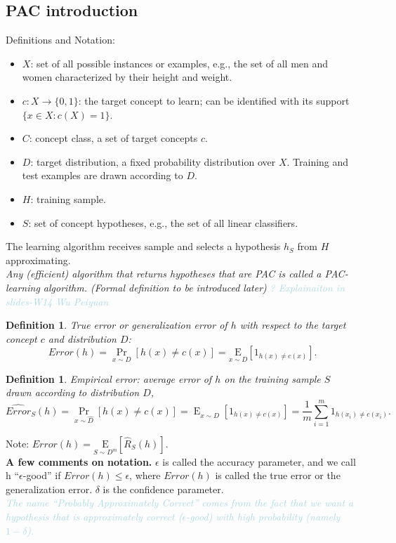\documentclass[12pt, a4paper, oneside]{article}
\newtheorem{definition}[theorem]{Definition}
\begin{document}
\subsection{PAC introduction}
Definitions and Notation:
\begin{itemize}
    \item $X$: set of all possible instances or examples, e.g., 
    the set of all men and women characterized by their height and weight.
    \item $c: X \rightarrow \{0, 1\}$: the target concept to learn; can be identified with its support $\{x \in X: c(X)=1\}$.
    \item $C$: concept class, a set of target concepts $c$.
    \item $D$: target distribution, a fixed probability distribution over $X$. Training and test examples are drawn according to $D$.
    \item $H$: training sample.
    \item $S$: set of concept hypotheses, e.g., the set of all linear classifiers. 
\end{itemize}
The learning algorithm receives sample and selects a hypothesis $h_S$ from $H$ approximating.
\\\textit{Any (efficient) algorithm that returns hypotheses that are PAC is called a PAC-learning algorithm. 
(Formal definition to be introduced later)} \textit{\textcolor{lightBlue}{? Explainaiton in slides-W14 Wu Peiyuan}}
\begin{definition}
    True error or generalization error of $h$ with respect to the target concept $c$ and distribution $D$:
    \begin{equation*}
        Error(h)=\operatorname{Pr}_{x \sim D}[h(x) \neq c(x)]=\underset{x \sim D}{\mathrm{E}}\left[1_{h(x) \neq c(x)}\right] .
    \end{equation*}    
\end{definition}
\begin{definition}
    Empirical error: average error of $ h $ on the training sample $ S $ drawn according to distribution $ D $,
    \begin{equation*}
        \widehat{Error}_{S}(h)=\operatorname{Pr}_{x \sim \widehat{D}}[h(x) \neq c(x)]=\operatorname{E}_{x \sim \widehat{D}}\left[1_{h(x) \neq c(x)}\right]=\frac{1}{m} \sum_{i=1}^{m} 1_{h\left(x_{i}\right) \neq c\left(x_{i}\right)} .
    \end{equation*}
\end{definition}
Note: $ Error(h)=\underset{S \sim D^{m}}{\mathrm{E}}\left[\widehat{R}_{S}(h)\right]$.
\\ \textbf{A few comments on notation.} $\epsilon$ is called the accuracy parameter, and we call h “$\epsilon $-good”
if $Error(h) \leq \epsilon $, where $Error(h)$ is called the true error or the generalization error. $\delta$ is
the confidence parameter.
\\ \textit{\textcolor{lightBlue}{The
name “Probably Approximately Correct” comes from the fact that we want a hypothesis
that is approximately correct ($\epsilon $-good) with high probability (namely $1- \delta$).}}
\end{document}
